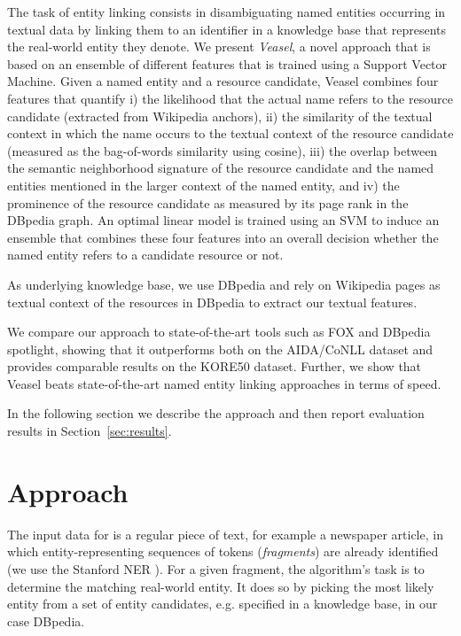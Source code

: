 \documentclass[runningheads,a4paper]{llncs}
\begin{document}
The task of entity linking consists in disambiguating named entities occurring in textual data by linking them to an identifier in a knowledge base that represents the real-world entity they denote. We present \emph{Veasel}, a novel approach that is based on an ensemble of different features that is trained using a Support Vector Machine.  Given a named entity and a resource candidate, Veasel combines four features that quantify i) the likelihood that the actual name refers to the resource candidate (extracted from Wikipedia anchors), ii) the similarity of the textual context in which the name occurs to the textual context of the resource candidate (measured as the bag-of-words similarity using cosine), iii) the overlap between the semantic neighborhood signature of the resource candidate and the named entities mentioned in the larger context of the named entity, and iv) the prominence of the resource candidate as measured by its page rank in the DBpedia graph. An optimal linear model is trained using an SVM to induce an ensemble that combines these four features into an overall decision whether the named entity refers to a candidate resource or not.  

As underlying knowledge base, we use DBpedia and rely on Wikipedia pages as textual context of the resources in DBpedia to extract our textual features.

We compare our approach to state-of-the-art tools such as FOX\cite{foxdemo} and DBpedia spotlight\cite{spotlight}, showing that it outperforms both on the AIDA/CoNLL dataset and provides comparable results on the KORE50 dataset. Further, we show that Veasel beats state-of-the-art named entity linking approaches in terms of speed.

In the following section we describe the approach and then report evaluation results in Section~\ref{sec:results}.


\section{Approach}\label{sec:approach}

The input data for {\acronym} is a regular piece of text, for example a newspaper article, in which entity-representing sequences of tokens (\emph{fragments}) are already identified (we use the Stanford NER \cite{ner}). For a given fragment, the algorithm's task is to determine the matching real-world entity. It does so by picking the most likely entity from a set of entity candidates, e.g. specified in a knowledge base, in our case DBpedia. 
\end{document}
